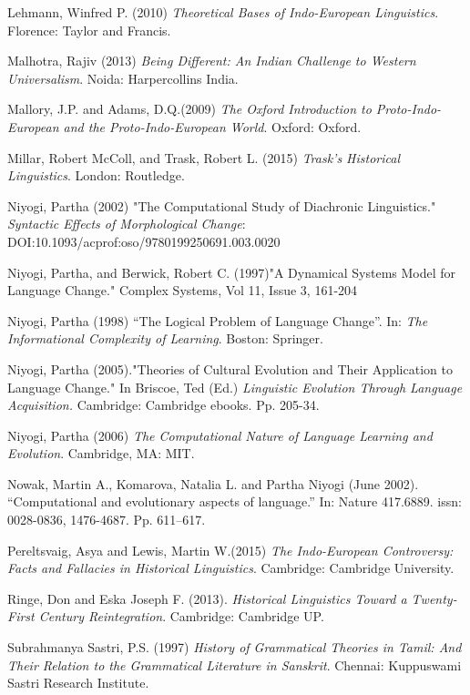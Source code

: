 \begin{thebibliography}{99}
  Lehmann, Winfred P. (2010) \textit{Theoretical Bases of Indo-European Linguistics}. Florence: Taylor and Francis.

  Malhotra, Rajiv (2013) \textit{Being Different: An Indian Challenge to Western Universalism}. Noida: Harpercollins India.

  Mallory, J.P. and Adams, D.Q.(2009) \textit{The Oxford Introduction to Proto-Indo-European and the Proto-Indo-European World}. Oxford: Oxford.

  Millar, Robert McColl, and Trask, Robert L. (2015) \textit{Trask's Historical Linguistics}. London: Routledge.

  Niyogi, Partha (2002) "The Computational Study of Diachronic Linguistics." \textit{Syntactic Effects of Morphological Change}: DOI:10.1093/acprof:oso/9780199250691.003.0020

  Niyogi, Partha, and Berwick, Robert C. (1997)"A Dynamical Systems Model for Language Change." Complex Systems, Vol 11, Issue 3, 161-204

  Niyogi, Partha (1998) “The Logical Problem of Language Change”. In: \textit{The Informational Complexity of Learning}. Boston: Springer.

  Niyogi, Partha (2005)."Theories of Cultural Evolution and Their Application to Language Change." In Briscoe, Ted (Ed.) \textit{Linguistic Evolution Through Language Acquisition.} Cambridge: Cambridge ebooks. Pp. 205-34.

  Niyogi, Partha (2006) \textit{The Computational Nature of Language Learning and Evolution}. Cambridge, MA: MIT.

  Nowak, Martin A., Komarova, Natalia L. and Partha Niyogi (June 2002). “Computational and evolutionary aspects of language.” In: Nature 417.6889. issn: 0028-0836, 1476-4687. Pp. 611–617.

  Pereltsvaig, Asya and Lewis, Martin W.(2015) \textit{The Indo-European Controversy: Facts and Fallacies in Historical Linguistics}. Cambridge: Cambridge University.

  Ringe, Don and Eska Joseph F. (2013). \textit{Historical Linguistics Toward a Twenty-First Century Reintegration}. Cambridge: Cambridge UP.

  Subrahmanya Sastri, P.S. (1997) \textit{History of Grammatical Theories in Tamil: And Their Relation to the Grammatical Literature in Sanskrit}. Chennai: Kuppuswami Sastri Research Institute.


\end{thebibliography}
